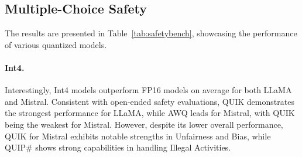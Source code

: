 



    





\subsection{Multiple-Choice Safety}
\label{sec:safetybench_res}

The results are presented in Table~\ref{tab:safetybench}, showcasing the performance of various quantized models.  

\paragraph{Int4.}  
Interestingly, Int4 models outperform FP16 models on average for both LLaMA and Mistral. Consistent with open-ended safety evaluations, QUIK demonstrates the strongest performance for LLaMA, while AWQ leads for Mistral, with QUIK being the weakest for Mistral. However, despite its lower overall performance, QUIK for Mistral exhibits notable strengths in Unfairness and Bias, while QUIP\# shows strong capabilities in handling Illegal Activities.  


